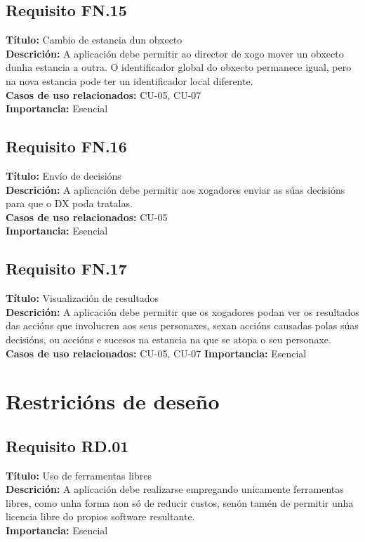 \subsection{Requisito FN.15}
{\bf Título:} Cambio de estancia dun obxecto\\
{\bf Descrición:} A aplicación debe permitir ao director de xogo mover un obxecto dunha estancia a outra. O identificador global do obxecto permanece igual, pero na nova estancia pode ter un identificador local diferente.\\
{\bf Casos de uso relacionados:} CU-05, CU-07\\
{\bf Importancia:} Esencial

\subsection{Requisito FN.16}
{\bf Título:} Envío de decisións\\
{\bf Descrición:} A aplicación debe permitir aos xogadores enviar as súas decisións para que o DX poda tratalas.\\
{\bf Casos de uso relacionados:} CU-05\\
{\bf Importancia:} Esencial

\subsection{Requisito FN.17}
{\bf Título:} Visualización de resultados\\
{\bf Descrición:} A aplicación debe permitir que os xogadores podan ver os resultados das accións que involucren aos seus personaxes, sexan accións causadas polas súas decisións, ou accións e sucesos na estancia na que se atopa o seu personaxe.
{\bf Casos de uso relacionados:} CU-05, CU-07
{\bf Importancia:} Esencial



\section{Restricións de deseño}

\subsection{Requisito RD.01}
{\bf Título:} Uso de ferramentas libres\\
{\bf Descrición:} A aplicación debe realizarse empregando unicamente ferramentas libres, como unha forma non só de reducir custos, senón tamén de permitir unha licencia libre do propios software resultante.\\
{\bf Importancia:} Esencial


